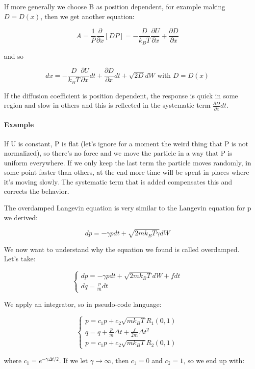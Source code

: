\documentclass[a4paper, italian, openany]{book}
\begin{document}
\medskip

If more generally we choose B as position dependent, for example making $D=D(x)$, then we get another equation:

$$A = \frac{1}{P}\frac{\partial}{\partial x} \left [ DP \right ] = - \frac{D}{k_B T} \frac{\partial U}{\partial x} + \frac{\partial D}{\partial x}$$

and so

$$dx = -\frac{D}{k_B T}\frac{\partial U}{\partial x}dt + \frac{\partial D}{\partial x}dt + \sqrt{2D}dW \mbox{ with } D=D(x)$$

If the diffusion coefficient is position dependent, the response is quick in some region and slow in others and this is reflected in the systematic term $\frac{\partial D}{\partial x}dt$.

\paragraph{Example}

If U is constant, P is flat (let's ignore for a moment the weird thing that P is not normalized), so there's no force and we move the particle in a way that P is uniform everywhere. If we only keep the last term the particle moves randomly, in some point faster than others, at the end more time will be spent in places where it's moving slowly. The systematic term that is added compensates this and corrects the behavior.

The overdamped Langevin equation is very similar to the Langevin equation for p we derived:

$$dp = -\gamma p dt + \sqrt{2m k_B T \gamma} dW$$

We now want to understand why the equation we found is called overdamped. Let's take:

$$\begin{cases}
dp = -\gamma p dt + \sqrt{2mk_B T}dW + fdt\\
dq = \frac{p}{m}dt
\end{cases}$$

We apply an integrator, so in pseudo-code language:

$$\begin{cases}
p = c_1 p + c_2 \sqrt{m k_B T} R_1(0, 1)\\
q = q +\frac{p}{m}\Delta t + \frac{f}{2m}\Delta t^2\\
p = c_1 p + c_2 \sqrt{m k_B T} R_2(0, 1)
\end{cases}$$

where $c_1 = e^{-\gamma \Delta t/2}$. If we let $\gamma \to \infty$, then $c_1 = 0$ and $c_2 = 1$, so we end up with:
\end{document}
